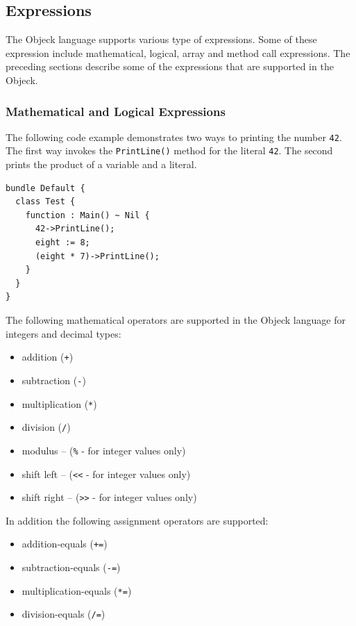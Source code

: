 \documentclass[12pt]{article}
\begin{document}
\subsection{Expressions}
The Objeck language supports various type of expressions.  Some of
these expression include mathematical, logical, array and method call
expressions.  The preceding sections describe some of the expressions
that are supported in the Objeck.

\subsubsection{Mathematical and Logical Expressions}
The following code example demonstrates two ways to printing the
number \texttt{42}.  The first way invokes the \texttt{PrintLine()}
method for the literal \texttt{42}.  The second prints the product of
a variable and a literal.

\begin{verbatim}
bundle Default {
  class Test {
    function : Main() ~ Nil {
      42->PrintLine();
      eight := 8;
      (eight * 7)->PrintLine();
    }
  }
}
\end{verbatim}

The following mathematical operators are supported in the Objeck
language for integers and decimal types:
\begin{itemize}
\item addition (\texttt{+})
\item subtraction (\texttt{-})
\item multiplication (\texttt{*})
\item division (\texttt{/})
\item modulus -- (\texttt{\%} - for integer values only)
\item shift left -- (\texttt{<<} - for integer values only)
\item shift right -- (\texttt{>>} - for integer values only)
\end{itemize}

In addition the following assignment operators are supported:
\begin{itemize}
\item addition-equals (\texttt{+=})
\item subtraction-equals (\texttt{-=})
\item multiplication-equals (\texttt{*=})
\item division-equals (\texttt{/=})
\end{itemize}
\end{document}
